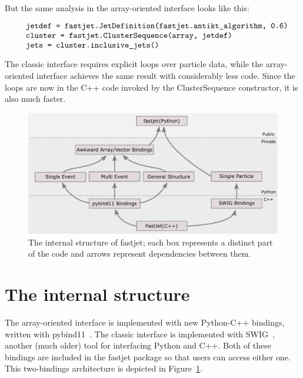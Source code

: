 \documentclass[a4paper]{jpconf}
\begin{document}
\noindent But the same analysis in the array-oriented interface looks like this:

\vspace{-0.4 cm}\begin{equation}\label{eqn:array-oriented}
\begin{minipage}{0.9\linewidth}
\begin{verbatim}
jetdef = fastjet.JetDefinition(fastjet.antikt_algorithm, 0.6)
cluster = fastjet.ClusterSequence(array, jetdef)
jets = cluster.inclusive_jets()
\end{verbatim}
\end{minipage}
\end{equation}

\noindent The classic interface requires explicit loops over particle data, while the array-oriented interface achieves the same result with considerably less code. Since the loops are now in the C++ code invoked by the ClusterSequence constructor, it is also much faster.

\begin{figure}
\begin{minipage}{39pc}
\begin{center}
\includegraphics[width=0.6\linewidth]{graphic-23.pdf}
\caption{\label{fig:design}The internal structure of fastjet; each box represents a distinct part of the code and arrows represent dependencies between them.}
\end{center}
\end{minipage}\hspace{2pc}%
\end{figure}

\section{The internal structure}

The array-oriented interface is implemented with new Python-C++ bindings, written with pybind11~\cite{pybind11}. The classic interface is implemented with SWIG~\cite{10.5555/1267498.1267513}, another (much older) tool for interfacing Python and C++. Both of these bindings are included in the fastjet package so that users can access either one. This two-bindings architecture is depicted in Figure~\ref{fig:design}.
\end{document}
